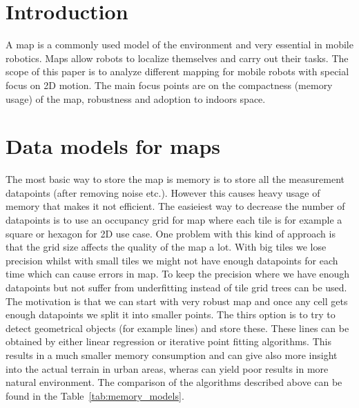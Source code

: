 \documentclass[12pt, a4paper, onecolumn]{article}
\begin{document}
\maketitle

\section{Introduction}
A map is a commonly used model of the environment and very essential in mobile robotics. Maps allow robots to localize themselves and carry out their tasks.
The scope of this paper is to analyze different mapping for mobile robots with special focus on 2D motion.
The main focus points are on the compactness (memory usage) of the map, robustness and adoption to indoors space.


\section{Data models for maps}
The most basic way to store the map is memory is to store all the measurement datapoints (after removing noise etc.).
However this causes heavy usage of memory that makes it not efficient.
The easieiest way to decrease the number of datapoints is to use an occupancy grid for map where each tile is for example a square or hexagon for 2D use case.
One problem with this kind of approach is that the grid size affects the quality of the map a lot.
With big tiles we lose precision whilst with small tiles we might not have enough datapoints for each time which can cause errors in map.
To keep the precision where we have enough datapoints but not suffer from underfitting instead of tile grid trees can be used.
The motivation is that we can start with very robust map and once any cell gets enough datapoints we split it into smaller points.
The thirs option is to try to detect geometrical objects (for example lines) and store these.
These lines can be obtained by either linear regression or iterative point fitting algorithms.
This results in a much smaller memory consumption and can give also more insight into the actual terrain in urban areas, wheras can yield poor results in more natural environment.
\cite{AlgorithmsForIndoorMapping}
The comparison of the algorithms described above can be found in the Table~\ref{tab:memory_models}.
\end{document}
